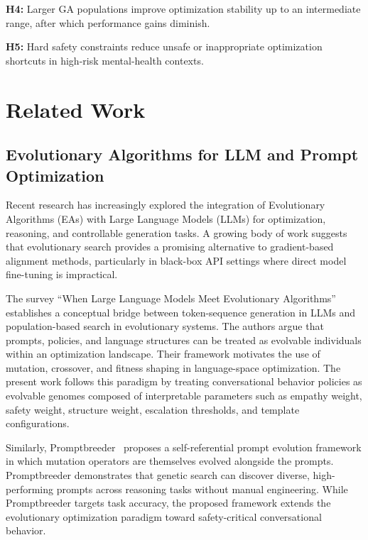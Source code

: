 \documentclass[mathematics,article,xetex,moreauthors]{Definitions/mdpi}
\begin{document}
\textbf{H4:} Larger GA populations improve optimization stability up to an
intermediate range, after which performance gains diminish.

\textbf{H5:} Hard safety constraints reduce unsafe or inappropriate
optimization shortcuts in high-risk mental-health contexts.

\section{Related Work}
\label{sec:related}

\subsection{Evolutionary Algorithms for LLM and Prompt Optimization}

Recent research has increasingly explored the integration of Evolutionary
Algorithms (EAs) with Large Language Models (LLMs) for optimization, reasoning,
and controllable generation tasks. A growing body of work suggests that
evolutionary search provides a promising alternative to gradient-based alignment
methods, particularly in black-box API settings where direct model fine-tuning
is impractical.

The survey ``When Large Language Models Meet Evolutionary
Algorithms''~\cite{when_llms_meet_ea2025} establishes a conceptual bridge
between token-sequence generation in LLMs and population-based search in
evolutionary systems. The authors argue that prompts, policies, and language
structures can be treated as evolvable individuals within an optimization
landscape. Their framework motivates the use of mutation, crossover, and fitness
shaping in language-space optimization. The present work follows this paradigm
by treating conversational behavior policies as evolvable genomes composed of
interpretable parameters such as empathy weight, safety weight, structure
weight, escalation thresholds, and template configurations.

Similarly, Promptbreeder~\cite{epo2025} proposes a self-referential
prompt evolution framework in which mutation operators are themselves
evolved alongside the prompts. Promptbreeder demonstrates that genetic
search can discover diverse, high-performing prompts across reasoning
tasks without manual engineering. While Promptbreeder targets task
accuracy, the proposed framework extends the evolutionary optimization
paradigm toward safety-critical conversational behavior.
\end{document}
